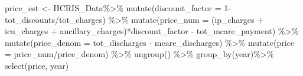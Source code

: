 \documentclass[
]{article}
\newenvironment{Shaded}{\begin{snugshade}}{\end{snugshade}}
\newcommand{\AttributeTok}[1]{\textcolor[rgb]{0.77,0.63,0.00}{#1}}
\newcommand{\DecValTok}[1]{\textcolor[rgb]{0.00,0.00,0.81}{#1}}
\newcommand{\FunctionTok}[1]{\textcolor[rgb]{0.00,0.00,0.00}{#1}}
\newcommand{\NormalTok}[1]{#1}
\newcommand{\OtherTok}[1]{\textcolor[rgb]{0.56,0.35,0.01}{#1}}
\newcommand{\SpecialCharTok}[1]{\textcolor[rgb]{0.00,0.00,0.00}{#1}}
\begin{document}
\begin{Shaded}
\begin{Highlighting}[]
\NormalTok{price\_est }\OtherTok{\textless{}{-}}\NormalTok{ HCRIS\_Data}\SpecialCharTok{\%\textgreater{}\%}
\FunctionTok{mutate}\NormalTok{(}\AttributeTok{discount\_factor =} \DecValTok{1}\SpecialCharTok{{-}}\NormalTok{tot\_discounts}\SpecialCharTok{/}\NormalTok{tot\_charges) }\SpecialCharTok{\%\textgreater{}\%}
\FunctionTok{mutate}\NormalTok{(}\AttributeTok{price\_num =}\NormalTok{ (ip\_charges }\SpecialCharTok{+}\NormalTok{ icu\_charges }\SpecialCharTok{+}\NormalTok{ ancillary\_charges)}\SpecialCharTok{*}\NormalTok{discount\_factor }\SpecialCharTok{{-}}\NormalTok{ tot\_mcare\_payment) }\SpecialCharTok{\%\textgreater{}\%}
\FunctionTok{mutate}\NormalTok{(}\AttributeTok{price\_denom =}\NormalTok{ tot\_discharges }\SpecialCharTok{{-}}\NormalTok{ mcare\_discharges) }\SpecialCharTok{\%\textgreater{}\%}
\FunctionTok{mutate}\NormalTok{(}\AttributeTok{price =}\NormalTok{ price\_num}\SpecialCharTok{/}\NormalTok{price\_denom) }\SpecialCharTok{\%\textgreater{}\%}
 \FunctionTok{ungroup}\NormalTok{() }\SpecialCharTok{\%\textgreater{}\%}
  \FunctionTok{group\_by}\NormalTok{(year)}\SpecialCharTok{\%\textgreater{}\%}
  \FunctionTok{select}\NormalTok{(price, year) }
 

\end{Highlighting}
\end{Shaded}
\end{document}
